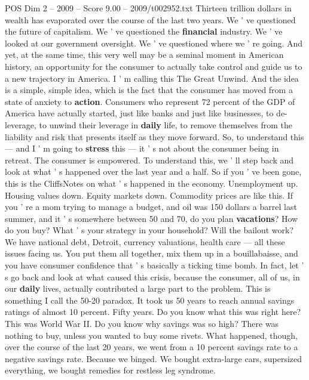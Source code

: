 \begin{textsample}{POS Dim 2 – 2009 – Score 9.00 – 2009/t002952.txt}  \label{ex:f2_pos_093}
Thirteen trillion dollars in wealth has evaporated over the course of the last two years.
We ' ve questioned the future of capitalism.
We ' ve questioned the \textbf{financial} industry.
We ' ve looked at our government oversight.
We ' ve questioned where we ' re going.
And yet, at the same time, this very well may be a seminal moment in American history, an opportunity for the consumer to actually take control and guide us to a new trajectory in America.
I ' m calling this The Great Unwind.
And the idea is a simple, simple idea, which is the fact that the consumer has moved from a state of anxiety to \textbf{action}.
Consumers who represent 72 percent of the GDP of America have actually started, just like banks and just like businesses, to de-leverage, to unwind their leverage in \textbf{daily} life, to remove themselves from the liability and risk that presents itself as they move forward.
So, to understand this — and I ' m going to \textbf{stress} this — it ' s not about the consumer being in retreat.
The consumer is empowered.
To understand this, we ' ll step back and look at what ' s happened over the last year and a half.
So if you ' ve been gone, this is the CliffsNotes on what ' s happened in the economy.
Unemployment up.
Housing values down.
Equity markets down.
Commodity prices are like this.
If you ' re a mom trying to manage a budget, and oil was 150 dollars a barrel last summer, and it ' s somewhere between 50 and 70, do you plan \textbf{vacations}?
How do you buy?
What ' s your strategy in your household?
Will the bailout work?
We have national debt, Detroit, currency valuations, health care — all these issues facing us.
You put them all together, mix them up in a bouillabaisse, and you have consumer confidence that ' s basically a ticking time bomb.
In fact, let ' s go back and look at what caused this crisis, because the consumer, all of us, in our \textbf{daily} lives, actually contributed a large part to the problem.
This is something I call the 50-20 paradox.
It took us 50 years to reach annual savings ratings of almost 10 percent.
Fifty years.
Do you know what this was right here?
This was World War II.
Do you know why savings was so high?
There was nothing to buy, unless you wanted to buy some rivets.
What happened, though, over the course of the last 20 years, we went from a 10 percent savings rate to a negative savings rate.
Because we binged.
We bought extra-large cars, supersized everything, we bought remedies for restless leg syndrome.

\end{textsample}
